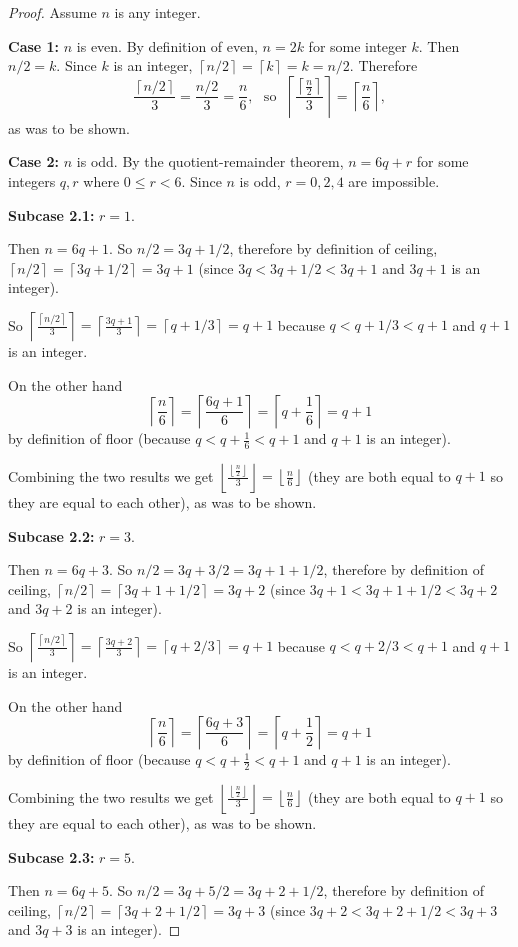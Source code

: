 \documentclass[14pt]{extarticle}
\newcommand{\floor}[1]{{\left\lfloor#1\right\rfloor}}
\newcommand{\ceil}[1]{{\left\lceil#1\right\rceil}}
\begin{document}
\begin{proof}
Assume $n$ is any integer.

{\bf Case 1:} $n$ is even. By definition of even, $n = 2k$ for some integer $k$. Then $n/2 = k$. Since $k$ is an integer, $\ceil{n/2} = \ceil{k} = k = n/2$. Therefore 
\[
\frac{\ceil{n/2}}{3} = \frac{n/2}{3} = \frac{n}{6}, \,\, \text{ so } \,\, \ceil{\frac{\ceil{\frac{n}{2}}}{3}} = \ceil{\frac{n}{6}},
\]
as was to be shown.

{\bf Case 2:} $n$ is odd. By the quotient-remainder theorem, $n = 6q+r$ for some integers $q,r$ where $0 \leq r < 6$. Since $n$ is odd, $r = 0, 2, 4$ are impossible.

{\bf Subcase 2.1:} $r = 1$. 

Then $n = 6q+1$. So $n/2 = 3q+1/2$, therefore by definition of ceiling, $\ceil{n/2} = \ceil{3q+1/2} = 3q+1$ (since $3q < 3q+1/2< 3q+1$ and $3q+1$ is an integer). 

So $\ceil{\frac{\ceil{n/2}}{3}} = \ceil{\frac{3q+1}{3}} = \ceil{q+1/3} = q+1$ because $q < q+1/3 < q+1$ and $q+1$ is an integer.

On the other hand 
\[
\ceil{\frac{n}{6}} = \ceil{\frac{6q+1}{6}} = \ceil{q+\frac{1}{6}} = q+1
\]
by definition of floor (because $q < q+\frac{1}{6} < q+1$ and $q+1$ is an integer).

Combining the two results we get $ \floor{\frac{\floor{\frac{n}{2}}}{3}} = \floor{\frac{n}{6}}$ (they are both equal to $q+1$ so they are equal to each other), as was to be shown.

{\bf Subcase 2.2:} $r = 3$. 

Then $n = 6q+3$. So $n/2 = 3q+3/2 = 3q+1+1/2$, therefore by definition of ceiling, $\ceil{n/2} = \ceil{3q+1+1/2} = 3q+2$ (since $3q+1 < 3q+1+1/2< 3q+2$ and $3q+2$ is an integer). 

So $\ceil{\frac{\ceil{n/2}}{3}} = \ceil{\frac{3q+2}{3}} = \ceil{q+2/3} = q+1$ because $q < q+2/3 < q+1$ and $q+1$ is an integer.

On the other hand 
\[
\ceil{\frac{n}{6}} = \ceil{\frac{6q+3}{6}} = \ceil{q+\frac{1}{2}} = q+1
\]
by definition of floor (because $q < q+\frac{1}{2} < q+1$ and $q+1$ is an integer).

Combining the two results we get $ \floor{\frac{\floor{\frac{n}{2}}}{3}} = \floor{\frac{n}{6}}$ (they are both equal to $q+1$ so they are equal to each other), as was to be shown.

{\bf Subcase 2.3:} $r = 5$. 

Then $n = 6q+5$. So $n/2 = 3q+5/2 = 3q+2+1/2$, therefore by definition of ceiling, $\ceil{n/2} = \ceil{3q+2+1/2} = 3q+3$ (since $3q+2 < 3q+2+1/2< 3q+3$ and $3q+3$ is an integer). 


\end{proof}
\end{document}
